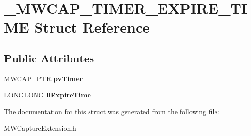 \hypertarget{struct__MWCAP__TIMER__EXPIRE__TIME}{\section{\-\_\-\-M\-W\-C\-A\-P\-\_\-\-T\-I\-M\-E\-R\-\_\-\-E\-X\-P\-I\-R\-E\-\_\-\-T\-I\-M\-E Struct Reference}
\label{struct__MWCAP__TIMER__EXPIRE__TIME}
}
\subsection*{Public Attributes}
\begin{DoxyCompactItemize}
\item 
\hypertarget{struct__MWCAP__TIMER__EXPIRE__TIME_a269ad769bc11bdd808c90b6849b21455}{M\-W\-C\-A\-P\-\_\-\-P\-T\-R {\bfseries pv\-Timer}}\label{struct__MWCAP__TIMER__EXPIRE__TIME_a269ad769bc11bdd808c90b6849b21455}

\item 
\hypertarget{struct__MWCAP__TIMER__EXPIRE__TIME_a3833ef20ff929a69f053f76670885816}{L\-O\-N\-G\-L\-O\-N\-G {\bfseries ll\-Expire\-Time}}\label{struct__MWCAP__TIMER__EXPIRE__TIME_a3833ef20ff929a69f053f76670885816}

\end{DoxyCompactItemize}


The documentation for this struct was generated from the following file\-:\begin{DoxyCompactItemize}
\item 
M\-W\-Capture\-Extension.\-h\end{DoxyCompactItemize}
